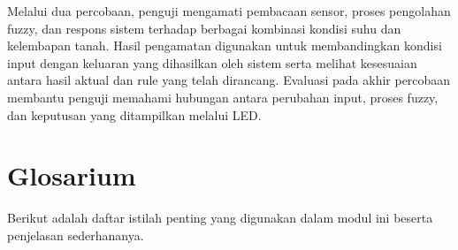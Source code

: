 \documentclass[12pt,a4paper]{article}
\begin{document}
Melalui dua percobaan, penguji mengamati pembacaan sensor, proses pengolahan fuzzy, dan respons sistem terhadap berbagai kombinasi kondisi suhu dan kelembapan tanah. Hasil pengamatan digunakan untuk membandingkan kondisi input dengan keluaran yang dihasilkan oleh sistem serta melihat kesesuaian antara hasil aktual dan rule yang telah dirancang. Evaluasi pada akhir percobaan membantu penguji memahami hubungan antara perubahan input, proses fuzzy, dan keputusan yang ditampilkan melalui LED.

\section{Glosarium}

Berikut adalah daftar istilah penting yang digunakan dalam modul ini beserta penjelasan sederhananya.
\end{document}
